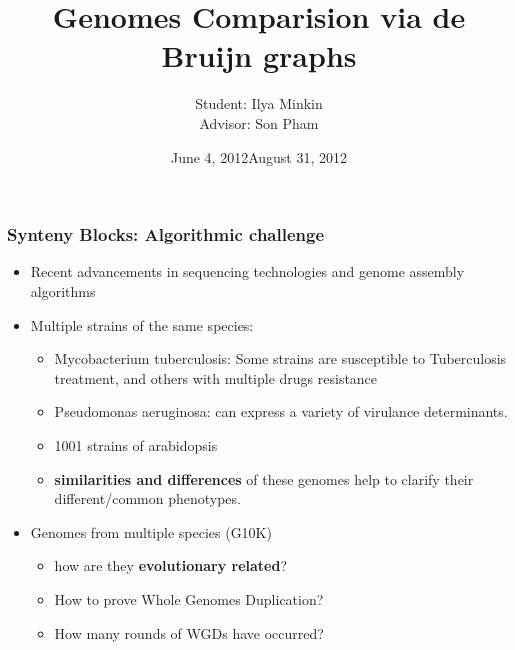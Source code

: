 \documentclass[svgnames,14pt]{beamer}
\title{Genomes Comparision via de Bruijn graphs}
\author{Student: Ilya Minkin \\ Advisor: Son Pham}
\institute{St. Petersburg Academic University}
\date{June 4, 2012}
\begin{document}
\def\braces#1{[#1]}
\newenvironment{changemargin}[2]{%
  \begin{list}{}{%
    \setlength{\topsep}{0pt}%
    \setlength{\leftmargin}{#1}%
    \setlength{\rightmargin}{#2}%
    \setlength{\listparindent}{\parindent}%
    \setlength{\itemindent}{\parindent}%
    \setlength{\parsep}{\parskip}%
  }%
  \item[]}{\end{list}}
\date{August 31, 2012}
\maketitle

\begin{frame}
\frametitle{Synteny Blocks: Algorithmic challenge}
\begin{itemize}
    \item Recent advancements in sequencing technologies and genome assembly algorithms
\item Multiple strains of the same species:
    \begin{itemize}
        \item Mycobacterium tuberculosis: Some strains are susceptible to Tuberculosis treatment, and others with multiple drugs resistance
        \item Pseudomonas aeruginosa: can express a variety of virulance determinants.
         \item 1001 strains of arabidopsis
        \pause
    \item \textbf{similarities and differences} of these genomes help to clarify their different/common phenotypes.
    \end{itemize}
\pause
\item Genomes from multiple species (G10K)
    \begin{itemize}
        \item how are they \textbf{evolutionary related}?
\item How to prove Whole Genomes Duplication?
\item How many rounds of WGDs have occurred?
    \end{itemize}
\end{itemize}
\end{frame}
\end{document}
